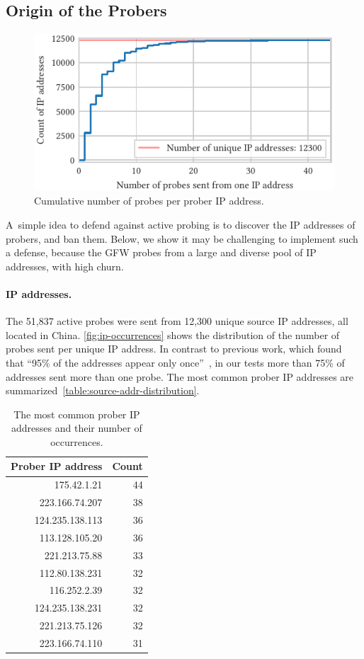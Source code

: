 \documentclass[sigconf,letterpaper]{acmart}
\begin{document}
\subsection{Origin of the Probers}
\label{sec:probe-origin}

\begin{figure}
    \includegraphics{figures/cdf_ip_occurrences.pdf}
    \caption{
        Cumulative number of probes per prober IP address.
    }
    \label{fig:ip-occurrences}
\end{figure}

A~simple idea to defend against active probing
is to discover the IP addresses of probers, and ban them.
Below, we show it may be challenging to implement such a defense,
because the GFW probes from a large and diverse pool of IP addresses, with high churn.

\paragraph{IP addresses.}
The 51,837 active probes were sent from 12,300 unique source IP addresses,
all located in China.
\autoref{fig:ip-occurrences} shows the distribution of the number of probes sent per unique IP address.
In contrast to previous work, which found that ``95\% of the addresses appear only once''~\cite[\S 5.3]{Ensafi2015b},
in our tests more than 75\% of addresses sent more than one probe.
The most common prober IP addresses are summarized~\autoref{table:source-addr-distribution}.

\begin{table}
\caption{
  The most common prober IP addresses and their number of occurrences.
}
\label{table:source-addr-distribution}
\center
\begin{tabular}{rr}
Prober IP address & Count \\
\midrule
175.42.1.21 & 44 \\
223.166.74.207 & 38 \\
124.235.138.113 & 36 \\
113.128.105.20 & 36 \\
221.213.75.88 & 33 \\
112.80.138.231 & 32 \\
116.252.2.39 & 32 \\
124.235.138.231 & 32 \\
221.213.75.126 & 32 \\
223.166.74.110 & 31
\end{tabular}
\end{table}
\end{document}
